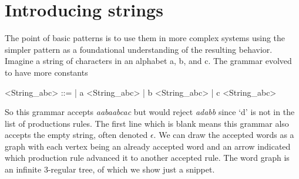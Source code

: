 \section{Introducing strings}
The point of basic patterns is to use them in more complex systems using the
simpler pattern as a foundational understanding of the resulting behavior.
Imagine a string of characters in an alphabet a, b, and c.  The grammar evolved
to have more constants 
\begin{center}
\begin{Gcode}[]
<String_abc> ::=  
               | a <String_abc> 
               | b <String_abc>
               | c <String_abc> 
\end{Gcode}
\end{center}
So this grammar accepts \emph{aabaabcac} 
but would reject \emph{adabb} since `d' is not in the list of productions 
rules.  The first line which is blank means this grammar also accepts the 
empty string, often denoted 
$\epsilon$.  We can draw the accepted words as a graph with each vertex 
being an already accepted word and an arrow indicated which production rule 
advanced it to another accepted rule.  The word graph is an infinite 
3-regular tree, of which we show just a snippet.
\begin{center}
\end{center}
